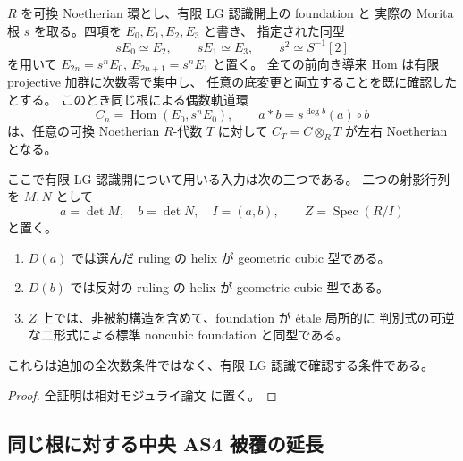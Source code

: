 \begin{lemma}
\label{lem:lg-two-rulings-universal-noetherian}
$R$ を可換 Noetherian 環とし、有限 LG 認識開上の foundation と
実際の Morita 根 $s$ を取る。四項を $E_0,E_1,E_2,E_3$ と書き、
指定された同型
\[
 sE_0\simeq E_2,\qquad sE_1\simeq E_3,
 \qquad s^2\simeq S^{-1}[2]
\]
を用いて $E_{2n}=s^nE_0$, $E_{2n+1}=s^nE_1$ と置く。
全ての前向き導来 Hom は有限 projective 加群に次数零で集中し、
任意の底変更と両立することを既に確認したとする。
このとき同じ根による偶数軌道環
\[
 C_n=\operatorname{Hom}(E_0,s^nE_0),\qquad
 a*b=s^{\deg b}(a)\circ b
\]
は、任意の可換 Noetherian $R$-代数 $T$ に対して
$C_T=C\otimes_RT$ が左右 Noetherian となる。

ここで有限 LG 認識開について用いる入力は次の三つである。
二つの射影行列を $M,N$ として
\[
 a=\det M,\quad b=\det N,\quad I=(a,b),
 \qquad Z=\operatorname{Spec}(R/I)
\]
と置く。
\begin{enumerate}
\item $D(a)$ では選んだ ruling の helix が geometric cubic 型である。
\item $D(b)$ では反対の ruling の helix が geometric cubic 型である。
\item $Z$ 上では、非被約構造を含めて、foundation が \'etale 局所的に
  判別式の可逆な二形式による標準 noncubic foundation と同型である。
\end{enumerate}
これらは追加の全次数条件ではなく、有限 LG 認識で確認する条件である。
\end{lemma}

\begin{proof}
全証明は相対モジュライ論文 \cite[noncubic有限型効果性]{QuadricModuli2026} に置く。
\end{proof}

\subsection{同じ根に対する中央 AS4 被覆の延長}


